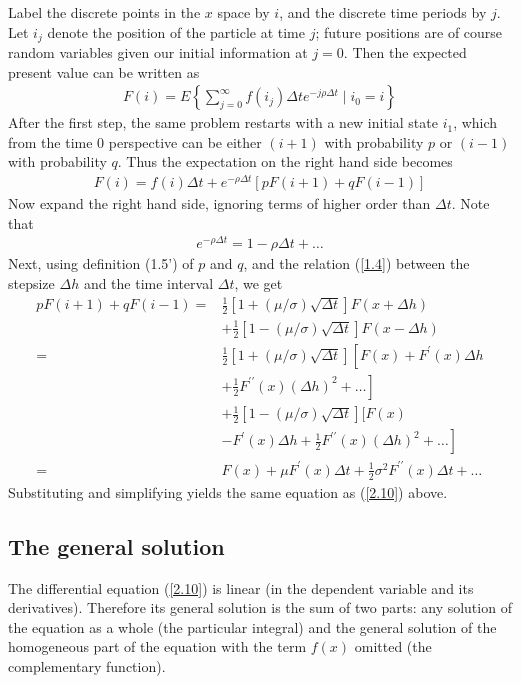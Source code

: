 \documentclass[12pt]{article}
\theoremstyle{definition}
\begin{document}
Label the discrete points in the $x$ space by $i$, and the discrete time periods by $j$. Let $i_{j}$ denote the position of the particle at time $j$; future positions are of course random variables given our initial information at $j=0$. Then the expected present value can be written as
\begin{align*}
F(i)=E\left\{\sum_{j=0}^{\infty} f\left(i_{j}\right) \Delta t e^{-j \rho \Delta t} \mid i_{0}=i\right\}
\end{align*}
After the first step, the same problem restarts with a new initial state $i_{1}$, which from the time 0 perspective can be either $(i+1)$ with probability $p$ or $(i-1)$ with probability $q$. Thus the expectation on the right hand side becomes
\begin{align*}
F(i)=f(i) \Delta t+e^{-\rho \Delta t}[p F(i+1)+q F(i-1)]
\end{align*}
Now expand the right hand side, ignoring terms of higher order than $\Delta t$. Note that
\begin{align*}
e^{-\rho \Delta t}=1-\rho \Delta t+\ldots
\end{align*}
Next, using definition (1.5') of $p$ and $q$, and the relation (\ref{1.4}) between the stepsize $\Delta h$ and the time interval $\Delta t$, we get
\begin{align*}
p F(i+1)+q F(i-1)= & \frac{1}{2}[1+(\mu / \sigma) \sqrt{\Delta t}] F(x+\Delta h) \\
& +\frac{1}{2}[1-(\mu / \sigma) \sqrt{\Delta t}] F(x-\Delta h) \\
= & \frac{1}{2}[1+(\mu / \sigma) \sqrt{\Delta t}]\left[F(x)+F^{\prime}(x) \Delta h\right. \\
& \left.+\frac{1}{2} F^{\prime \prime}(x)(\Delta h)^{2}+\ldots\right] \\
& +\frac{1}{2}[1-(\mu / \sigma) \sqrt{\Delta t}][F(x) \\
& \left.-F^{\prime}(x) \Delta h+\frac{1}{2} F^{\prime \prime}(x)(\Delta h)^{2}+\ldots\right] \\
= & F(x)+\mu F^{\prime}(x) \Delta t+\frac{1}{2} \sigma^{2} F^{\prime \prime}(x) \Delta t+\ldots
\end{align*}
Substituting and simplifying yields the same equation as (\ref{2.10}) above.

\subsection{The general solution}
The differential equation (\ref{2.10}) is linear (in the dependent variable and its derivatives). Therefore its general solution is the sum of two parts: any solution of the equation as a whole (the particular integral) and the general solution of the homogeneous part of the equation with the term $f(x)$ omitted (the complementary function).
\end{document}
